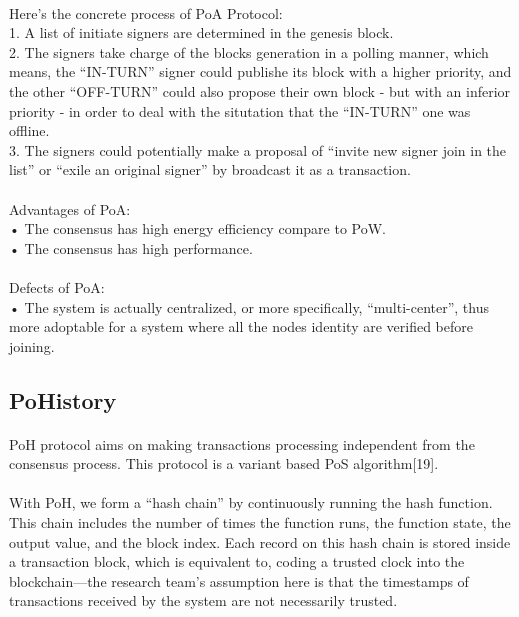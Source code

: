 \documentclass[]{article}
\begin{document}
\begin{CJK*}{UTF8}{gbsn}
	\paragraph{} 	
	Here's the concrete process of PoA Protocol: 
	\\1. A list of initiate signers are determined in the genesis block.
	\\2. The signers take charge of the blocks generation in a polling manner, which means, the ``IN-TURN'' signer could publishe its block with a higher priority, and the other ``OFF-TURN'' could also propose their own block - but with an inferior priority - in order to deal with the situtation that the ``IN-TURN'' one was offline.
	\\3. The signers could potentially make a proposal of ``invite new signer join in the list'' or ``exile an original signer'' by broadcast it as a transaction.
	\paragraph{} 
Advantages of PoA:
\\• The consensus has high energy efficiency compare to PoW.
\\• The consensus has high performance.
	\paragraph{} 
Defects of PoA:
\\• The system is actually centralized, or more specifically, ``multi-center'', thus more adoptable for a system where all the nodes identity are verified before joining.
	
	\subsection{PoHistory}
	\paragraph{} 
	PoH protocol aims on making transactions processing independent from the consensus process. This protocol is a variant based PoS algorithm[19].
	\paragraph{} 
	With PoH, we form a ``hash chain'' by continuously running the hash function. This chain includes the number of times the function runs, the function state, the output value, and the block index. Each record on this hash chain is stored inside a transaction block, which is equivalent to, coding a trusted clock into the blockchain—the research team's assumption here is that the timestamps of transactions received by the system are not necessarily trusted.

\end{CJK*}
\end{document}
